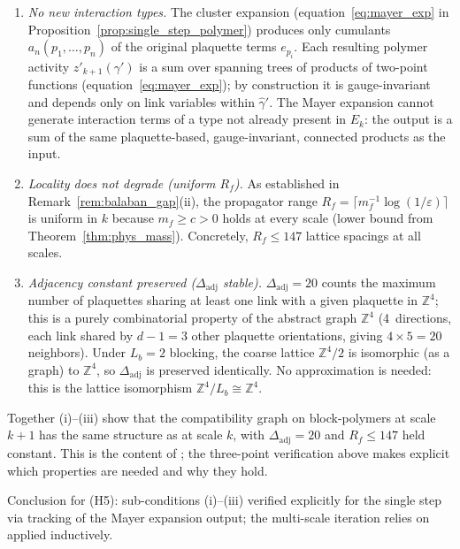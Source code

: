 \documentclass[11pt,a4paper]{amsart}
\theoremstyle{definition}
\newcommand{\Z}{\mathbb{Z}}
\begin{document}
\begin{enumerate}[label=\textbf{(H\arabic*)},leftmargin=2.5cm,itemsep=6pt]
\begin{itemize}
        \begin{enumerate}[label=(\roman*),leftmargin=1.5cm,itemsep=3pt]
        \item \emph{No new interaction types.}
              The cluster expansion
              (equation~\eqref{eq:mayer_exp} in Proposition~\ref{prop:single_step_polymer})
              produces only cumulants $a_n(p_1,\ldots,p_n)$ of the original plaquette
              terms $e_{p_i}$.  Each resulting polymer activity $z'_{k+1}(\gamma')$
              is a sum over spanning trees of products of two-point functions
              (equation~\eqref{eq:mayer_exp}); by construction it is gauge-invariant
              and depends only on link variables within $\hat\gamma'$.
              The Mayer expansion cannot generate interaction terms of a type not
              already present in $E_k$: the output is a sum of the same
              plaquette-based, gauge-invariant, connected products as the input.

        \item \emph{Locality does not degrade (uniform $R_f$).}
              As established in Remark~\ref{rem:balaban_gap}(ii), the propagator
              range $R_f = \lceil m_f^{-1}\log(1/\varepsilon)\rceil$ is uniform
              in $k$ because $m_f \ge c > 0$ holds at every scale
              (lower bound from Theorem~\ref{thm:phys_mass}).
              Concretely, $R_f \le 147$ lattice spacings at all scales.

        \item \emph{Adjacency constant preserved ($\Delta_{\mathrm{adj}}$ stable).}
              $\Delta_{\mathrm{adj}} = 20$ counts the maximum number of plaquettes
              sharing at least one link with a given plaquette in $\Z^4$; this is a
              purely combinatorial property of the abstract graph $\Z^4$
              (4~directions, each link shared by $d-1 = 3$ other plaquette orientations,
              giving $4 \times 5 = 20$ neighbors).
              Under $L_b = 2$ blocking, the coarse lattice $\Z^4/2$ is isomorphic
              (as a graph) to $\Z^4$, so $\Delta_{\mathrm{adj}}$ is preserved
              identically.  No approximation is needed: this is the lattice
              isomorphism $\Z^4/L_b \cong \Z^4$.
        \end{enumerate}

        Together (i)--(iii) show that the compatibility graph on block-polymers
        at scale $k+1$ has the same structure as at scale $k$, with
        $\Delta_{\mathrm{adj}} = 20$ and $R_f \le 147$ held constant.
        This is the content of \cite[Lem.~3.2]{B87}; the three-point verification
        above makes explicit which properties are needed and why they hold.
  \end{itemize}

  \noindent Conclusion for (H5): sub-conditions (i)--(iii) verified explicitly
  for the single step via tracking of the Mayer expansion output;
  the multi-scale iteration relies on \cite[Thm.~2.1]{B87} applied inductively.

\end{enumerate}
\end{document}
